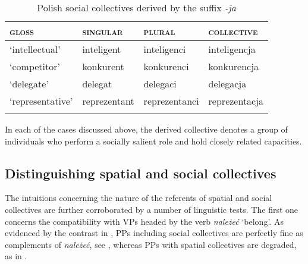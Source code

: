 \documentclass[output=paper]{langscibook}
\begin{document}
\begin{table}[h!]
\caption{Polish social collectives derived by the suffix \textit{-ja}} 
\label{wan:tab:inteligencja}
 \begin{tabular}{llll} 
  \lsptoprule
         \textsc{gloss}   & \textsc{singular} & \textsc{plural} & \textsc{collective} \\ 
  \midrule
  `intellectual'  &   inteligent &    inteligenci  &    inteligencja \\
  `competitor'  &   konkurent &   konkurenci &    konkurencja \\
  `delegate'  &   delegat &   delegaci &    delegacja \\
  `representative'  &   reprezentant &   reprezentanci &    reprezentacja \\
  \lspbottomrule
 \end{tabular}
\end{table}

In each of the cases discussed above, the derived collective denotes a group of individuals who perform a socially salient role and hold closely related capacities.  

\subsection{Distinguishing spatial and social collectives}\label{wan:sec:distinguishing-social-and-spatial-collectives}

The intuitions concerning the nature of the referents of spatial and social collectives are further corroborated by a number of linguistic tests. The first one concerns the compatibility with VPs headed by the verb \textit{należeć} `belong'. As evidenced by the contrast in , PPs including social collectives are perfectly fine as complements of \textit{należeć}, see , whereas PPs with spatial collectives are degraded, as in .

\ea\label{wan:ex:belong}
\label{wan:ex:belong-social}
\label{wan:ex:belong-spatial}
\z
\z
\end{document}
